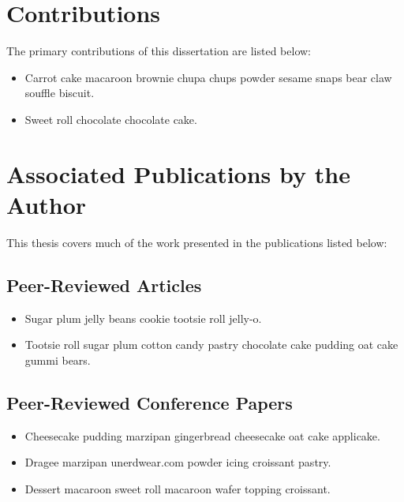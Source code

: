 \section{Contributions}
The primary contributions of this dissertation are listed below:

\begin{itemize}
  \onehalfspacing
\item Carrot cake macaroon brownie chupa chups powder sesame snaps bear claw souffle biscuit.
\item Sweet roll chocolate chocolate cake.
\end{itemize}

\section{Associated Publications by the Author}

This thesis covers much of the work presented in the publications listed below:

\subsection{Peer-Reviewed Articles}
\renewcommand{\thefootnote}{\fnsymbol{footnote}}
\vspace{1em}
\begin{itemize}
\onehalfspacing
\item Sugar plum jelly beans cookie tootsie roll jelly-o.
\item Tootsie roll sugar plum cotton candy pastry chocolate cake pudding oat cake gummi bears.
\end{itemize}

\subsection{Peer-Reviewed Conference Papers}
\vspace{1em}
\begin{itemize}
\onehalfspacing
\item Cheesecake pudding marzipan gingerbread cheesecake oat cake applicake.
\item  Dragee marzipan unerdwear.com powder icing croissant pastry.
\item  Dessert macaroon sweet roll macaroon wafer topping croissant.

\end{itemize}

